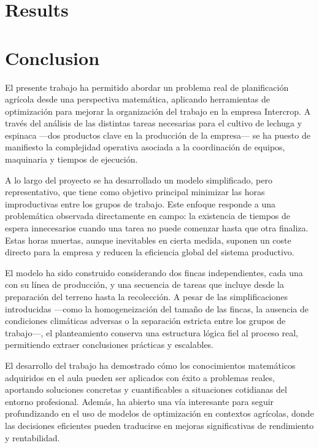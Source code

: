 \chapter*{Results}

\chapter*{Conclusion}
El presente trabajo ha permitido abordar un problema real de planificación agrícola desde una perspectiva matemática,
aplicando herramientas de optimización para mejorar la organización del trabajo en la empresa Intercrop.
A través del análisis de las distintas tareas necesarias para el cultivo de lechuga y espinaca —dos productos clave en la producción de la empresa—
se ha puesto de manifiesto la complejidad operativa asociada a la coordinación de equipos, maquinaria y tiempos de ejecución.

A lo largo del proyecto se ha desarrollado un modelo simplificado, pero representativo,
que tiene como objetivo principal minimizar las horas improductivas entre los grupos de trabajo.
Este enfoque responde a una problemática observada directamente en campo:
la existencia de tiempos de espera innecesarios cuando una tarea no puede comenzar hasta que otra finaliza.
Estas horas muertas, aunque inevitables en cierta medida, suponen un coste directo para la empresa y reducen la eficiencia global del sistema productivo.

El modelo ha sido construido considerando dos fincas independientes, cada una con su línea de producción,
y una secuencia de tareas que incluye desde la preparación del terreno hasta la recolección.
A pesar de las simplificaciones introducidas —como la homogeneización del tamaño de las fincas,
la ausencia de condiciones climáticas adversas o la separación estricta entre los grupos de trabajo—, el planteamiento conserva una estructura lógica fiel al proceso real,
permitiendo extraer conclusiones prácticas y escalables.

El desarrollo del trabajo ha demostrado cómo los conocimientos matemáticos adquiridos en el aula pueden ser aplicados con éxito a problemas reales,
aportando soluciones concretas y cuantificables a situaciones cotidianas del entorno profesional.
Además, ha abierto una vía interesante para seguir profundizando en el uso de modelos de optimización en contextos agrícolas,
donde las decisiones eficientes pueden traducirse en mejoras significativas de rendimiento y rentabilidad.

